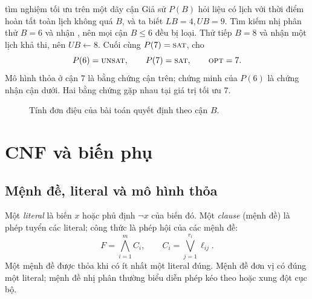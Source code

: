\begin{workedexample}{tìm nghiệm tối ưu trên một dãy cận}
Giả sử \(P(B)\) hỏi liệu có lịch với thời điểm hoàn tất toàn lịch không quá \(B\), và ta biết
\(LB=4,UB=9\). Tìm kiếm nhị phân thử \(B=6\) và nhận \UNSAT, nên mọi cận
\(B\le6\) đều bị loại. Thử tiếp \(B=8\) và nhận một lịch khả thi, nên
\(UB\leftarrow8\). Cuối cùng \(P(7)=\textsc{sat}\), cho
\[
  P(6)=\textsc{unsat},\qquad P(7)=\textsc{sat},\qquad \textsc{opt}=7.
\]
Mô hình thỏa ở cận \(7\) là bằng chứng cận trên; chứng minh \UNSAT của \(P(6)\)
là chứng nhận cận dưới. Hai bằng chứng gặp nhau tại giá trị tối ưu \(7\).
\end{workedexample}

\begin{figure}[tb]
\centering
{}
\caption{Tính đơn điệu của bài toán quyết định theo cận \(B\).}
\label{fig:bound-transition}
\end{figure}

\section{CNF và biến phụ}

\subsection{Mệnh đề, literal và mô hình thỏa}

Một \emph{literal} là biến \(x\) hoặc phủ định \(\neg x\) của biến đó. Một
\emph{clause} (mệnh đề) là phép tuyển các literal; công thức \CNF là phép hội
của các mệnh đề:
\[
  F=\bigwedge_{i=1}^{m}C_i,
  \qquad
  C_i=\bigvee_{j=1}^{r_i}\ell_{ij}.
\]
Một mệnh đề được thỏa khi có ít nhất một literal đúng. Mệnh đề đơn vị có đúng
một literal; mệnh đề nhị phân thường biểu diễn phép kéo theo hoặc xung đột cục
bộ.

